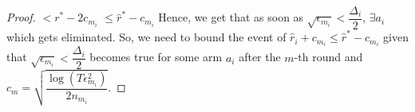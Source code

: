 \begin{proof}
\newline\hspace*{14em}$< r^{*} -2c_{m_{i}} $
\newline\hspace*{14em}$\leq \hat{r}^{*} - c_{m_{i}}$
\newline Hence, we get that as soon as $\sqrt{\epsilon_{m_{i}}}<\dfrac{\Delta_{i}}{2}$, $\exists a_{i}$ which gets eliminated.
\newline So, we need to bound the event of $\hat{r}_{i}+c_{m_{i}}\leq \hat{r}^{*}-c_{m_{i}}$ given that $\sqrt{\epsilon_{m_{i}}}<\dfrac{\Delta_{i}}{2}$ becomes true for some arm $a_{i}$ after the $m$-th round and $c_{m}=\sqrt{\dfrac{\log (T\epsilon_{m_{i}}^{2})}{2 n_{m_{i}}}}$.


\end{proof}
